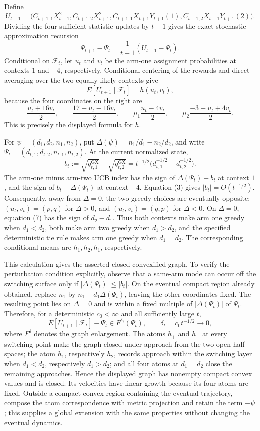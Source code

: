 Define
\[
 U_{t+1}=\bigl(C_{t+1,1}X_{t+1}^2,C_{t+1,2}X_{t+1}^2,
 C_{t+1,1}X_{t+1}Y_{t+1}(1),C_{t+1,2}X_{t+1}Y_{t+1}(2)\bigr).
\]
Dividing the four sufficient-statistic updates by \(t+1\) gives the exact stochastic-approximation recursion
\[
 \Psi_{t+1}-\Psi_t=\frac1{t+1}(U_{t+1}-\Psi_t). \tag{5}
\]
Conditional on \(\mathcal F_t\), let \(u_t\) and \(v_t\) be the arm-one assignment probabilities at contexts \(1\) and \(-4\), respectively. Conditional centering of the rewards and direct averaging over the two equally likely contexts give
\[
 E[U_{t+1}\mid\mathcal F_t]=h(u_t,v_t), \tag{6}
\]
because the four coordinates on the right are
\[
 \frac{u_t+16v_t}{2},\qquad \frac{17-u_t-16v_t}{2},\qquad
 \mu_1\frac{u_t-4v_t}{2},\qquad
 \mu_2\frac{-3-u_t+4v_t}{2}.
\]
This is precisely the displayed formula for \(h\).

For \(\psi=(d_1,d_2,n_1,n_2)\), put \(\Delta(\psi)=n_1/d_1-n_2/d_2\), and write \(\Psi_t=(d_{t,1},d_{t,2},n_{t,1},n_{t,2})\). At the current normalized state,
\[
 b_t:=\sqrt{q^{\mathrm{GX}}_{t,1}}-\sqrt{q^{\mathrm{GX}}_{t,2}}
 =t^{-1/2}\bigl(d_{t,1}^{-1/2}-d_{t,2}^{-1/2}\bigr). \tag{7}
\]
The arm-one minus arm-two UCB index has the sign of \(\Delta(\Psi_t)+b_t\) at context \(1\), and the sign of \(b_t-\Delta(\Psi_t)\) at context \(-4\). Equation (3) gives \(|b_t|=O(t^{-1/2})\). Consequently, away from \(\Delta=0\), the two greedy choices are eventually opposite: \((u_t,v_t)=(p,q)\) for \(\Delta>0\), and \((u_t,v_t)=(q,p)\) for \(\Delta<0\). On \(\Delta=0\), equation (7) has the sign of \(d_2-d_1\). Thus both contexts make arm one greedy when \(d_1<d_2\), both make arm two greedy when \(d_1>d_2\), and the specified deterministic tie rule makes arm one greedy when \(d_1=d_2\). The corresponding conditional means are \(h_1,h_2,h_1\), respectively.

This calculation gives the asserted closed convexified graph. To verify the perturbation condition explicitly, observe that a same-arm mode can occur off the switching surface only if \(|\Delta(\Psi_t)|\leq |b_t|\). On the eventual compact region already obtained, replace \(n_1\) by \(n_1-d_1\Delta(\Psi_t)\), leaving the other coordinates fixed. The resulting point lies on \(\Delta=0\) and is within a fixed multiple of \(|\Delta(\Psi_t)|\) of \(\Psi_t\). Therefore, for a deterministic \(c_0<\infty\) and all sufficiently large \(t\),
\[
 E[U_{t+1}\mid\mathcal F_t]-\Psi_t\in F^{\delta_t}(\Psi_t),
 \qquad \delta_t=c_0t^{-1/2}\longrightarrow0, \tag{8}
\]
where \(F^\delta\) denotes the graph enlargement. The atoms \(h_+\) and \(h_-\) at every switching point make the graph closed under approach from the two open half-spaces; the atom \(h_1\), respectively \(h_2\), records approach within the switching layer when \(d_1<d_2\), respectively \(d_1>d_2\); and all four atoms at \(d_1=d_2\) close the remaining approaches. Hence the displayed graph has nonempty compact convex values and is closed. Its velocities have linear growth because its four atoms are fixed. Outside a compact convex region containing the eventual trajectory, compose the atom correspondence with metric projection and retain the term \(-\psi\); this supplies a global extension with the same properties without changing the eventual dynamics.

